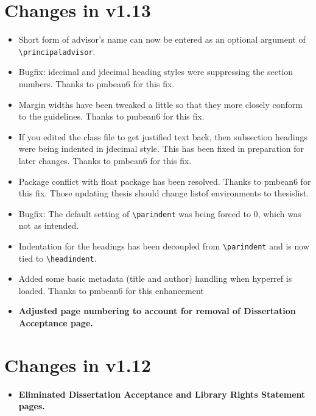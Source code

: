 \section{Changes in v1.13}
\begin{itemize}
\item{Short form of advisor's name can now be entered as an optional argument of \verb=\principaladvisor=.}
\item{Bugfix: idecimal and jdecimal heading styles were suppressing the section numbers.  Thanks to pmbean6 for this fix.}
\item{Margin widths have been tweaked a little so that they more closely conform to the guidelines.  Thanks to pmbean6 for this fix.}
\item{If you edited the class file to get justified text back, then subsection headings were being indented in jdecimal style.  This has been fixed in preparation for later changes.  Thanks to pmbean6 for this fix.}
\item{Package conflict with float package has been resolved.  Thanks to pmbean6 for this fix.  Those updating thesis should change listof environments to thesislist.}
\item{Bugfix: The default setting of \verb=\parindent= was being forced to 0, which was not as intended.}
\item{Indentation for the headings has been decoupled from \verb=\parindent= and is now tied to \verb=\headindent=.}
\item{Added some basic metadata (title and author) handling when hyperref is loaded.  Thanks to pmbean6 for this enhancement}
\item{\bfseries Adjusted page numbering to account for removal of Dissertation Acceptance page.}
\end{itemize}

\section{Changes in v1.12}
\begin{itemize}
\item{\bfseries Eliminated Dissertation Acceptance and Library Rights Statement pages.}
\end{itemize}

